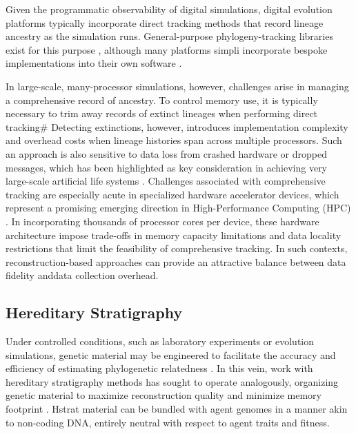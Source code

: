 Given the programmatic observability of digital simulations, digital evolution platforms typically incorporate direct tracking methods that record lineage ancestry as the simulation runs.
General-purpose phylogeny-tracking libraries exist for this purpose \citep{dolson2024phylotrack}, although many platforms simpli incorporate bespoke implementations into their own software \citep{ofria2004avida}.

In large-scale, many-processor simulations, however, challenges arise in managing a comprehensive record of ancestry.
To control memory use, it is typically necessary to trim away records of extinct lineages when performing direct tracking#
Detecting extinctions, however, introduces implementation complexity and overhead costs when lineage histories span across multiple processors.
Such an approach is also sensitive to data loss from crashed hardware or dropped messages, which has been highlighted as key consideration in achieving very large-scale artificial life systems \citep{ackley2016indefinite,ackley2014indefinitely}.
Challenges associated with comprehensive tracking are especially acute in specialized hardware accelerator devices, which represent a promising emerging direction in High-Performance Computing (HPC) \citep{emani2024democratizing}.
In incorporating thousands of processor cores per device, these hardware architecture impose trade-offs in memory capacity limitations and data locality restrictions that limit the feasibility of comprehensive tracking.
In such contexts, reconstruction-based approaches can provide an attractive balance between data fidelity anddata collection overhead.

\subsection{Hereditary Stratigraphy} \label{sec:introduction:hstrat}



Under controlled conditions, such as laboratory experiments or evolution simulations, genetic material may be engineered to facilitate the accuracy and efficiency of estimating phylogenetic relatedness \citep{li2024reconstructing}.
In this vein, work with hereditary stratigraphy methods has sought to operate analogously, organizing genetic material to maximize reconstruction quality and minimize memory footprint \citep{moreno2022hereditary}.
Hstrat material can be bundled with agent genomes in a manner akin to non-coding DNA, entirely neutral with respect to agent traits and fitness.

